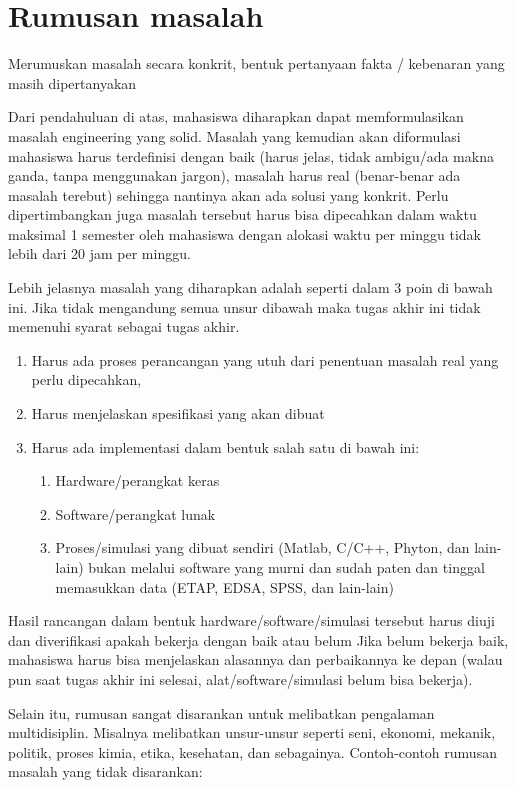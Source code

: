 \section{Rumusan masalah} \label{I.Rumusan Masalah}
\indent Merumuskan masalah secara konkrit, bentuk pertanyaan fakta / kebenaran yang masih dipertanyakan \par
Dari pendahuluan di atas, mahasiswa diharapkan dapat memformulasikan masalah engineering yang solid. Masalah yang kemudian akan diformulasi mahasiswa harus terdefinisi dengan baik (harus jelas, tidak ambigu/ada makna ganda, tanpa menggunakan jargon), masalah harus real (benar-benar ada masalah terebut) sehingga nantinya akan ada solusi yang konkrit. Perlu dipertimbangkan juga masalah tersebut harus bisa dipecahkan dalam waktu maksimal 1 semester oleh mahasiswa dengan alokasi waktu per minggu tidak lebih dari 20 jam per minggu. \par
Lebih jelasnya masalah yang diharapkan adalah seperti dalam 3 poin di bawah ini. Jika tidak mengandung semua unsur dibawah maka tugas akhir ini tidak memenuhi syarat sebagai tugas akhir. \par
\begin{enumerate}
	\item Harus ada proses perancangan yang utuh dari penentuan masalah real yang perlu dipecahkan, 
	\item Harus menjelaskan spesifikasi yang akan dibuat
	\item Harus ada implementasi dalam bentuk salah satu di bawah ini:
	\begin{enumerate}
		\item Hardware/perangkat keras
		\item Software/perangkat lunak
		\item Proses/simulasi yang dibuat sendiri (Matlab, C/C++, Phyton, dan lain-lain) bukan melalui software yang murni dan sudah paten dan tinggal memasukkan data (ETAP, EDSA, SPSS, dan lain-lain)
	\end{enumerate}
\end{enumerate} \par
Hasil rancangan dalam bentuk hardware/software/simulasi tersebut harus diuji dan diverifikasi apakah bekerja dengan baik atau belum Jika belum bekerja baik, mahasiswa harus bisa menjelaskan alasannya dan perbaikannya ke depan (walau pun saat tugas akhir ini selesai, alat/software/simulasi belum bisa bekerja).\par
Selain itu, rumusan sangat disarankan untuk melibatkan pengalaman multidisiplin. Misalnya melibatkan unsur-unsur seperti seni, ekonomi, mekanik, politik, proses kimia, etika, kesehatan, dan sebagainya. Contoh-contoh rumusan masalah yang tidak disarankan: \par

